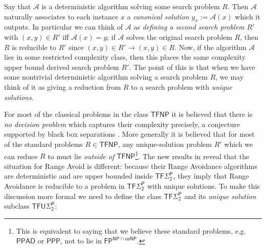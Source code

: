 Say that $\mathcal{A}$ is a deterministic algorithm solving some search problem $R$. Then $\mathcal{A}$ naturally associates to each instance $x$ a \emph{canonical solution} $y_x:= \mathcal{A}(x)$ which it outputs. In particular we can think of $\mathcal{A}$ as \emph{defining a second search problem} $R'$ with $(x,y) \in R'$ iff $\mathcal{A}(x)=y$; if $\mathcal{A}$ solves the original search problem $R$, then $R$ is reducible to $R'$ since $(x,y)\in R' \rightarrow (x,y)\in R$. Now, if the algorithm $\mathcal{A}$ lies in some restricted complexity class, then this places the same complexity upper bound derived search problem $R'$. The point of this is that when we have some nontrivial deterministic algorithm solving a search problem $R$, we may think of it as giving a reduction from $R$ to a search problem with \emph{unique solutions}.

For most of the classical problems in the class $\mathsf{TFNP}$ it is believed that there is \emph{no decision problem} which captures their complexity precisely, a conjecture supported by black box separations \cite{TFNP-separations}. More generally it is believed that for most of the standard problems $R \in \mathsf{TFNP}$, any unique-solution problem $R'$ which we can reduce $R$ to must lie \emph{outside of} $\mathsf{TFNP}$\footnote{This is equivalent to saying that we believe these standard problems, e.g. $\mathsf{PPAD}$ or $\mathsf{PPP}$, not to lie in $\mathsf{FP^{NP \cap coNP}}$.}. The new results in \cite{Li,CHR} reveal that the situation for Range Avoid is different: because their Range Avoidance algorithms are deterministic and are upper bounded inside $\mathsf{TF\Sigma_2^P}$, they imply that Range Avoidance is reducible to a problem in $\mathsf{TF\Sigma_2^P}$ with unique solutions. To make this discussion more formal we need to define the class $\mathsf{TF\Sigma_2^P}$ and its \emph{unique solution} subclass $\mathsf{TFU\Sigma_2^P}$:

